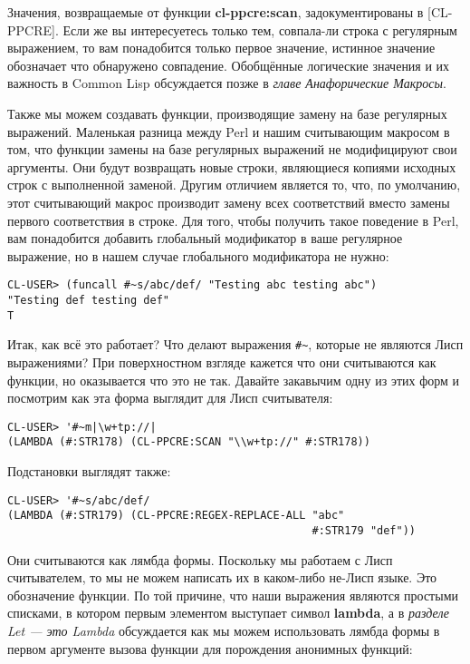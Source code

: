 Значения, возвращаемые от функции \textbf{cl-ppcre:scan}, задокументированы в [CL-PPCRE]. Если же вы интересуетесь только тем, совпала-ли строка с регулярным выражением, то вам понадобится только первое значение, истинное значение обозначает что обнаружено совпадение. Обобщённые логические значения и их важность в Common Lisp обсуждается позже в \emph{главе Анафорические Макросы}.

Также мы можем создавать функции, производящие замену на базе регулярных выражений. Маленькая разница между Perl и нашим считывающим макросом в том, что функции замены на базе регулярных выражений не модифицируют свои аргументы. Они будут возвращать новые строки, являющиеся копиями исходных строк с выполненной заменой. Другим отличием является то, что, по умолчанию, этот считывающий макрос производит замену всех соответствий вместо замены первого соответствия в строке. Для того, чтобы получить такое поведение в Perl, вам понадобится добавить глобальный модификатор в ваше регулярное выражение, но в нашем случае глобального модификатора не нужно:

\begin{verbatim}
CL-USER> (funcall #~s/abc/def/ "Testing abc testing abc")
"Testing def testing def"
T
\end{verbatim}

Итак, как всё это работает? Что делают выражения \verb"#~", которые не являются Лисп выражениями? При поверхностном взгляде кажется что они считываются как функции, но оказывается что это не так. Давайте закавычим одну из этих форм и посмотрим как эта форма выглядит для Лисп считывателя:

\begin{verbatim}
CL-USER> '#~m|\w+tp://|
(LAMBDA (#:STR178) (CL-PPCRE:SCAN "\\w+tp://" #:STR178))
\end{verbatim}

Подстановки выглядят также:

\begin{verbatim}
CL-USER> '#~s/abc/def/
(LAMBDA (#:STR179) (CL-PPCRE:REGEX-REPLACE-ALL "abc" 
                                               #:STR179 "def"))
\end{verbatim}

Они считываются как лямбда формы. Поскольку мы работаем с Лисп считывателем, то мы не можем написать их в каком-либо не-Лисп языке. Это обозначение функции. По той причине, что наши выражения являются простыми списками, в котором первым элементом выступает символ \textbf{lambda}, а в \emph{разделе Let --- это Lambda} обсуждается как мы можем использовать лямбда формы в первом аргументе вызова функции для порождения анонимных функций:

